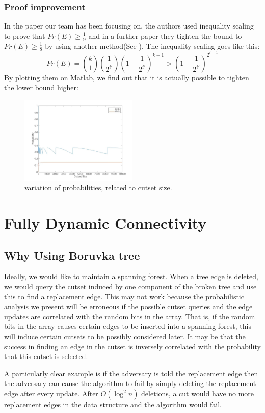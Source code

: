 \documentclass[conference,compsoc]{IEEEtran}
\begin{document}
\subsubsection*{Proof improvement} In the paper our team has been focusing on, the authors used inequality scaling to prove that $Pr(E) \ge \frac{1}{9}$ and in a further paper they tighten the bound to $Pr(E) \ge \frac{1}{8}$ by using another method(See \cite{article}). The inequality scaling goes like this:
$$Pr(E)={k \choose 1}(\frac{1}{2^{i'}})(1-\frac{1}{2^{i'}})^{k-1} > (1-\frac{1}{2^{i'}})^{2^{i'+1}}$$
By plotting them on Matlab, we find out that it is actually possible to tighten the lower bound higher:
\begin{figure}[H]
	\centering
	\includegraphics[width=0.5\textwidth]{Pic/fig.jpg}
	\caption{ variation of probabilities, related to cutset size.}
	\label{fig:7}
\end{figure}

\section{Fully Dynamic Connectivity}
\subsection{Why Using Boruvka tree}
Ideally, we would like to maintain a spanning forest. When a tree edge is deleted, we would query the cutset induced by one component of the broken tree and use this to find a replacement edge. This may not work because the probabilistic analysis we present will be erroneous if the possible cutset queries and the edge updates are correlated with the random bits in the array. That is, if the random bits in the array causes certain edges to be inserted into a spanning forest, this will induce certain cutsets to be possibly considered later. It may be that the success in finding an edge in the cutset is inversely correlated with the probability that this cutset is selected.

A particularly clear example is if the adversary is told the replacement edge then the adversary can cause the algorithm to fail by simply deleting the replacement edge after every update. After $O(\log^2 n)$ deletions, a cut would have no more replacement edges in the data structure and the algorithm would fail.
\end{document}
